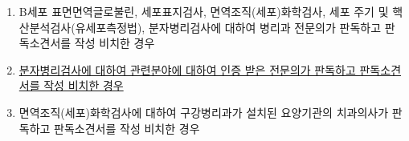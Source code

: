 \begin{enumerate}[(1)]
\begin{enumerate}[(가)]
	\item B세포 표면면역글로불린, 세포표지검사, 면역조직(세포)화학검사, 세포 주기 및 핵산분석검사(유세포측정법), 분자병리검사에 대하여 병리과 전문의가 판독하고 판독소견서를 작성\cntrdot{} 비치한 경우
	\item \uline{분자병리검사에 대하여 관련분야에 대하여 인증 받은 전문의가 판독하고 판독소견서를 작성\cntrdot{} 비치한 경우}
	\item 면역조직(세포)화학검사에 대하여 구강병리과가 설치된 요양기관의 치과의사가 판독하고 판독소견서를 작성\cntrdot{} 비치한 경우
	\end{enumerate}
\end{enumerate}
	
